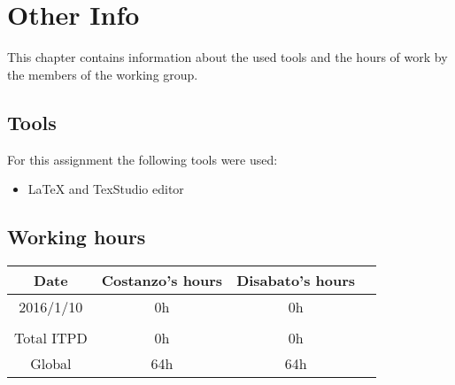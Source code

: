 \documentclass[\mainpath/main]{subfiles}
\begin{document}
\chapter{Other Info}
\label{OtherInfo}

\setmyfancystyle

This chapter contains information about the used tools and the hours of work by the members of the working group.

\section{Tools}
For this assignment the following tools were used:
\begin{itemize}
	\item \LaTeX{} and TexStudio editor
\end{itemize}

\section{Working hours}
\begin{table}[h!]
	\centering
\begin{tabular}{cccc}
\hline
Date       & Costanzo's hours & Disabato's hours  & \\ \hline
2016/1/10 & 0h 			  & 0h 			  & \\ \hline

\\
Total ITPD  & 0h 		      & 0h 			 	  & \\ \hline
Global 	   & 64h 		 	  & 64h 			  & \\ \hline

\end{tabular}
\end{table}
\end{document}
